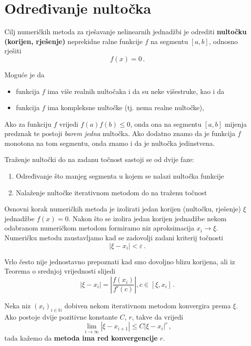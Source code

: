 \section{Određivanje nultočka}

Cilj numeričkih metoda za rješavanje nelinearnih jednadžbi je odrediti
\textbf{nultočku (korijen, rješenje)} neprekidne ralne funkcije $f$ na segmentu
$[a,b]$, odnosno rješiti
$$
    f(x) = 0\,.
$$

Moguće je da
\begin{itemize}
    \item funkcija $f$ ima više realnih nultočaka i da su neke višestruke, kao i
    da
    \item funkcija $f$ ima kompleksne nultočke (tj. nema realne nultočke),
\end{itemize}

Ako za funkciju $f$ vrijedi $f(a)f(b) \leq 0$, onda ona na segmentu $[a,b]$
mijenja predznak te postoji \textit{barem jedna} nultočka. Ako dodatno znamo da
je funkcija $f$ monotona na tom segmentu, onda znamo i da je nultočka
jedinstvena.

Traženje nultočki do na zadanu točnost sastoji se od dvije faze:
\begin{enumerate}
    \item Određivanje što manjeg segmenta u kojem se nalazi nultočka funkcije
    \item Nalaženje nultočke iterativnom metodom do na traženu točnost
\end{enumerate}

Osnovni korak numeričkih metoda je izolirati jedan korijen (nultočku, rješenje)
$\xi$ jednadžbe $f(x) = 0$. Nakon što se izolira jedan korijen jednadžbe nekom
odabranom numeričkom metodom formiramo niz aproksimacija $x_i \to \xi$.
Numeričku metodu zaustavljamo kad se zadovolji zadani kriterij točnosti
$$
    |\xi - x_i | < \varepsilon\,.
$$

Vrlo često nije jednostavno prepoznati kad smo dovoljno blizu korijena, ali iz
Teorema o srednjoj vrijednosti slijedi
$$
    |\xi - x_i| = \left| \frac{f(x_i)}{f'(c)} \right|, c \in [\xi, x_i]\,.
$$

\begin{definition}
    Neka niz $(x_i)_{i\in\mathbb{N}}$ dobiven nekom iterativnom metodom
    konvergira prema $\xi$. Ako postoje dvije pozitivne konstante $C$, $r$,
    takve da vrijedi
    $$
        \lim_{i\to\infty} \left|\xi-x_{i+1}\right| \leq C|\xi-x_i|^r\,,
    $$
    tada kažemo da \textbf{metoda ima red konvergencije} $r$. 
\end{definition}

